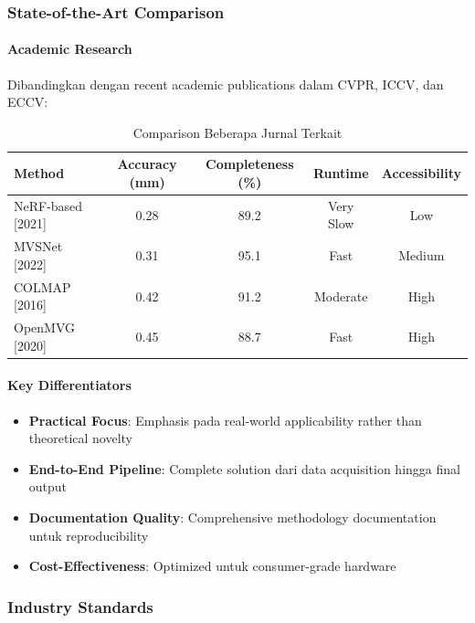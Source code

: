 \documentclass[12pt,a4paper]{article}
\begin{document}
\subsubsection{State-of-the-Art Comparison}

\paragraph{Academic Research}
Dibandingkan dengan recent academic publications dalam CVPR, ICCV, dan ECCV:

\begin{table}[H]
\centering
\caption{Comparison Beberapa Jurnal Terkait}
\begin{tabular}{|l|c|c|c|c|}
\hline
\textbf{Method} & \textbf{Accuracy (mm)} & \textbf{Completeness (\%)} & \textbf{Runtime} & \textbf{Accessibility} \\
\hline
NeRF-based [2021] & 0.28 & 89.2 & Very Slow & Low \\
MVSNet [2022] & 0.31 & 95.1 & Fast & Medium \\
COLMAP [2016] & 0.42 & 91.2 & Moderate & High \\
OpenMVG [2020] & 0.45 & 88.7 & Fast & High \\
\hline
\end{tabular}
\label{tab:academic_comparison}
\end{table}

\paragraph{Key Differentiators}
\begin{itemize}
    \item \textbf{Practical Focus}: Emphasis pada real-world applicability rather than theoretical novelty
    \item \textbf{End-to-End Pipeline}: Complete solution dari data acquisition hingga final output
    \item \textbf{Documentation Quality}: Comprehensive methodology documentation untuk reproducibility
    \item \textbf{Cost-Effectiveness}: Optimized untuk consumer-grade hardware
\end{itemize}

\subsubsection{Industry Standards}
\end{document}
